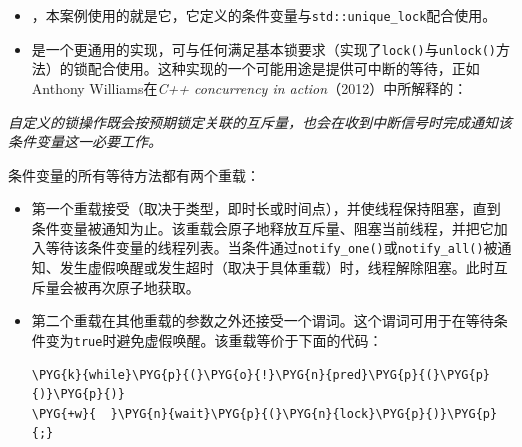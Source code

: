 \begin{itemize}
\item {}，本案例使用的就是它，它定义的条件变量与\texttt{std::\allowbreak{}unique\_\allowbreak{}lock}配合使用。



\item {}是一个更通用的实现，可与任何满足基本锁要求（实现了\texttt{lock()}与\texttt{unlock()}方法）的锁配合使用。这种实现的一个可能用途是提供可中断的等待，正如Anthony Williams在\textit{C++ concurrency in action}（2012）中所解释的：

\end{itemize}



\textit{自定义的锁操作既会按预期锁定关联的互斥量，也会在收到中断信号时完成通知该条件变量这一必要工作。}



条件变量的所有等待方法都有两个重载：


\begin{itemize}
\item 第一个重载接受（取决于类型，即时长或时间点），并使线程保持阻塞，直到条件变量被通知为止。该重载会原子地释放互斥量、阻塞当前线程，并把它加入等待该条件变量的线程列表。当条件通过\texttt{notify\_\allowbreak{}one()}或\texttt{notify\_\allowbreak{}all()}被通知、发生虚假唤醒或发生超时（取决于具体重载）时，线程解除阻塞。此时互斥量会被再次原子地获取。



\item 第二个重载在其他重载的参数之外还接受一个谓词。这个谓词可用于在等待条件变为\texttt{true}时避免虚假唤醒。该重载等价于下面的代码：



\begin{codeblockbg}
\begin{Verbatim}[commandchars=\\\{\},breaklines=true,breakanywhere=true,fontsize=\codefont,xleftmargin=17bp]
\PYG{k}{while}\PYG{p}{(}\PYG{o}{!}\PYG{n}{pred}\PYG{p}{(}\PYG{p}{)}\PYG{p}{)}
\PYG{+w}{  }\PYG{n}{wait}\PYG{p}{(}\PYG{n}{lock}\PYG{p}{)}\PYG{p}{;}
\end{Verbatim}
\end{codeblockbg}

\end{itemize}


